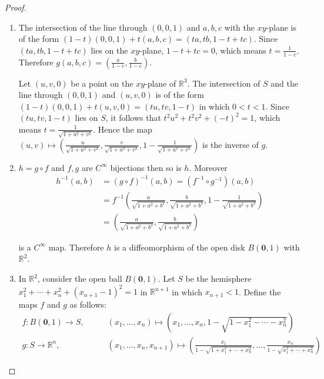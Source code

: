 \begin{proof}
	\begin{enumerate}[label={(\alph*)},leftmargin=*]
		\item The intersection of the line through \( (0, 0, 1) \) and \( a, b, c \) with the \( xy \)-plane is of the form \( (1 - t)(0, 0, 1) + t(a, b, c) = (ta, tb, 1 - t + tc) \). Since \( (ta, tb, 1 - t + tc) \) lies on the \( xy \)-plane, \( 1 - t + tc = 0 \), which means \( t = \frac{1}{1 - c} \). Therefore \( g(a, b, c) = \left(\frac{a}{1 - c}, \frac{b}{1 - c}\right) \).

		      Let \( (u, v, 0) \) be a point on the \( xy \)-plane of \( \mathbb{R}^{3} \). The intersection of \( S \) and the line through \( (0, 0, 1) \) and \( (u, v, 0) \) is of the form \( (1 - t)(0, 0, 1) + t(u, v, 0) = (tu, tv, 1 - t) \) in which \( 0 < t < 1 \). Since \( (tu, tv, 1 - t) \) lies on \( S \), it follows that \( t^{2}u^{2} + t^{2}v^{2} + {(-t)}^{2} = 1 \), which means \( t = \frac{1}{\sqrt{1 + u^{2} + v^{2}}} \). Hence the map \( (u, v) \mapsto \left(\frac{u}{\sqrt{1 + u^{2} + v^{2}}}, \frac{v}{\sqrt{1 + u^{2} + v^{2}}}, 1 - \frac{1}{\sqrt{1 + u^{2} + v^{2}}}\right) \) is the inverse of \( g \).
		\item \( h = g\circ f \) and \( f, g \) are \( C^{\infty} \) bijections then so is \( h \). Moreover
		      \begin{align*}
			      h^{-1}(a, b) & = {(g\circ f)}^{-1}(a, b) = (f^{-1} \circ g^{-1}) (a, b)                                                                              \\
			                   & = f^{-1}\left( \frac{a}{\sqrt{1 + a^{2} + b^{2}}}, \frac{b}{\sqrt{1 + a^{2} + b^{2}}}, 1 - \frac{1}{\sqrt{1 + a^{2} + b^{2}}} \right) \\
			                   & = \left( \frac{a}{\sqrt{1 + a^{2} + b^{2}}}, \frac{b}{\sqrt{1 + a^{2} + b^{2}}} \right)
		      \end{align*}

		      is a \( C^{\infty} \) map. Therefore \( h \) is a diffeomorphism of the open disk \( B(\mathbf{0}, 1) \) with \( \mathbb{R}^{2} \).
		\item In \( \mathbb{R}^{2} \), consider the open ball \( B(\mathbf{0}, 1) \). Let \( S \) be the hemisphere \( x_{1}^{2} + \cdots + x_{n}^{2} + {(x_{n+1} - 1)}^{2} = 1 \) in \( \mathbb{R}^{n+1} \) in which \( x_{n+1} < 1 \). Define the maps \( f \) and \( g \) as follows:
		      \begin{align*}
			      f: B(\mathbf{0}, 1) \to S, & \qquad (x_{1}, \ldots, x_{n}) \mapsto \left(x_{1}, \ldots, x_{n}, 1 - \sqrt{1 - x_{1}^{2} - \cdots - x_{n}^{2}}\right)                                                                    \\
			      g: S \to \mathbb{R}^{n},   & \qquad (x_{1}, \ldots, x_{n}, x_{n+1}) \mapsto \left(\frac{x_{1}}{1 - \sqrt{1 + x_{1}^{2} + \cdots + x_{n}^{2}}}, \ldots , \frac{x_{n}}{1 - \sqrt{x_{1}^{2} + \cdots + x_{n}^{2}}}\right)
		      \end{align*}


\end{enumerate}
\end{proof}
